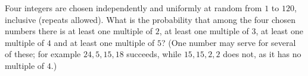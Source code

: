 Four integers are chosen independently and uniformly at random from $1$ to $120$, inclusive (repeats allowed). What is the probability that among the four chosen numbers there is at least one multiple of $2$, at least one multiple of $3$, at least one multiple of $4$ and at least one multiple of $5$? (One number may serve for several of these; for example $24,5,15,18$ succeeds, while $15,15,2,2$ does not, as it has no multiple of $4$.)
